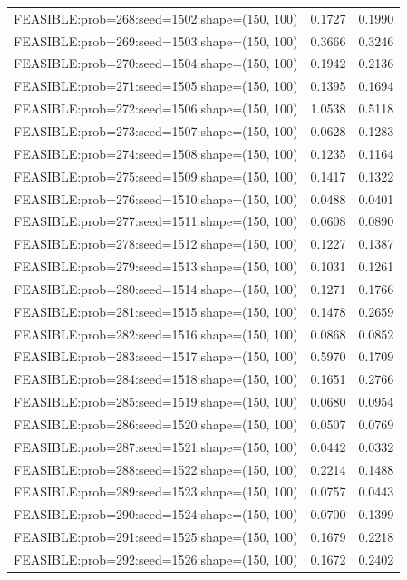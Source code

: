 \begin{longtable}{lcc}
FEASIBLE:prob=268:seed=1502:shape=(150, 100) &   0.1727 & 0.1990 \\
FEASIBLE:prob=269:seed=1503:shape=(150, 100) &   0.3666 & 0.3246 \\
FEASIBLE:prob=270:seed=1504:shape=(150, 100) &   0.1942 & 0.2136 \\
FEASIBLE:prob=271:seed=1505:shape=(150, 100) &   0.1395 & 0.1694 \\
FEASIBLE:prob=272:seed=1506:shape=(150, 100) &   1.0538 & 0.5118 \\
FEASIBLE:prob=273:seed=1507:shape=(150, 100) &   0.0628 & 0.1283 \\
FEASIBLE:prob=274:seed=1508:shape=(150, 100) &   0.1235 & 0.1164 \\
FEASIBLE:prob=275:seed=1509:shape=(150, 100) &   0.1417 & 0.1322 \\
FEASIBLE:prob=276:seed=1510:shape=(150, 100) &   0.0488 & 0.0401 \\
FEASIBLE:prob=277:seed=1511:shape=(150, 100) &   0.0608 & 0.0890 \\
FEASIBLE:prob=278:seed=1512:shape=(150, 100) &   0.1227 & 0.1387 \\
FEASIBLE:prob=279:seed=1513:shape=(150, 100) &   0.1031 & 0.1261 \\
FEASIBLE:prob=280:seed=1514:shape=(150, 100) &   0.1271 & 0.1766 \\
FEASIBLE:prob=281:seed=1515:shape=(150, 100) &   0.1478 & 0.2659 \\
FEASIBLE:prob=282:seed=1516:shape=(150, 100) &   0.0868 & 0.0852 \\
FEASIBLE:prob=283:seed=1517:shape=(150, 100) &   0.5970 & 0.1709 \\
FEASIBLE:prob=284:seed=1518:shape=(150, 100) &   0.1651 & 0.2766 \\
FEASIBLE:prob=285:seed=1519:shape=(150, 100) &   0.0680 & 0.0954 \\
FEASIBLE:prob=286:seed=1520:shape=(150, 100) &   0.0507 & 0.0769 \\
FEASIBLE:prob=287:seed=1521:shape=(150, 100) &   0.0442 & 0.0332 \\
FEASIBLE:prob=288:seed=1522:shape=(150, 100) &   0.2214 & 0.1488 \\
FEASIBLE:prob=289:seed=1523:shape=(150, 100) &   0.0757 & 0.0443 \\
FEASIBLE:prob=290:seed=1524:shape=(150, 100) &   0.0700 & 0.1399 \\
FEASIBLE:prob=291:seed=1525:shape=(150, 100) &   0.1679 & 0.2218 \\
FEASIBLE:prob=292:seed=1526:shape=(150, 100) &   0.1672 & 0.2402 \\

\end{longtable}
